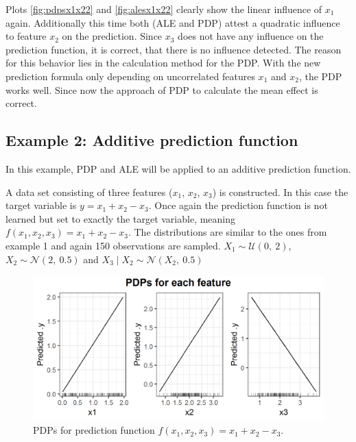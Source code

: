 \documentclass[]{krantz}
\begin{document}
Plots \ref{fig:pdpsx1x22} and \ref{fig:alesx1x22} clearly show the
linear influence of \(x_1\) again. Additionally this time both (ALE and
PDP) attest a quadratic influence to feature \(x_2\) on the prediction.
Since \(x_3\) does not have any influence on the prediction function, it
is correct, that there is no influence detected. The reason for this
behavior lies in the calculation method for the PDP. With the new
prediction formula only depending on uncorrelated features \(x_1\) and
\(x_2\), the PDP works well. Since now the approach of PDP to calculate
the mean effect is correct.

\subsection{Example 2: Additive prediction
function}\label{example-2-additive-prediction-function}

In this example, PDP and ALE will be applied to an additive prediction
function.

A data set consisting of three features (\(x_1\), \(x_2\), \(x_3\)) is
constructed. In this case the target variable is
\(y = x_1 + x_2 - x_3\). Once again the prediction function is not
learned but set to exactly the target variable, meaning
\(f(x_1, x_2, x_3) = x_1 + x_2 - x_3\). The distributions are similar to
the ones from example 1 and again 150 observations are sampled.
\(X_1 \sim \mathcal{U}(0,~2)\), \(X_2 \sim \mathcal{N}(2,~0.5)\) and
\(X_3\mid X_2 \sim \mathcal{N}(X_2,~0.5)\)

\begin{figure}
\includegraphics[width=1\linewidth]{images/ale_1_PDPs_x1_plus_x2_minus_x3_150_0_2_0p5} \caption{PDPs for prediction function
\(f(x_1, x_2, x_3) = x_1 + x_2 - x_3\).}\label{fig:pdpsx1px2mx3}
\end{figure}
\end{document}
